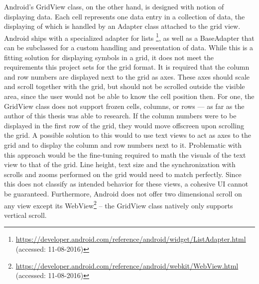Android's GridView class, on the other hand, is designed with notion of displaying data. Each cell represents one data entry in a collection of data, the displaying of which is handled by an Adapter class attached to the grid view. Android ships with a specialized adapter for lists \footnote{\url{https://developer.android.com/reference/android/widget/ListAdapter.html} (accessed: 11-08-2016)}, as well as a BaseAdapter that can be subclassed for a custom handling and presentation of data. While this is a fitting solution for displaying symbols in a grid, it does not meet the requirements this project sets for the grid format. It is required that the column and row numbers are displayed next to the grid as axes. These axes should scale and scroll together with the grid, but should not be scrolled outside the visible area, since the user would not be able to know the cell position then. For one, the GridView class does not support frozen cells, columns, or rows --- as far as the author of this thesis was able to research. If the column numbers were to be displayed in the first row of the grid, they would move offscreen upon scrolling the grid. A possible solution to this would to use text views to act as axes to the grid and to display the column and row numbers next to it. Problematic with this approach would be the fine-tuning required to math the visuals of the text view to that of the grid. Line height, text size and the synchronization with scrolls and zooms performed on the grid would need to match perfectly. Since this does not classify as intended behavior for these views, a cohesive \gls{UI} cannot be guaranteed. Furthermore, Android does not offer two dimensional scroll on any view except its WebView\footnote{\url{https://developer.android.com/reference/android/webkit/WebView.html} (accessed: 11-08-2016)} -- the GridView class natively only supports vertical scroll.

